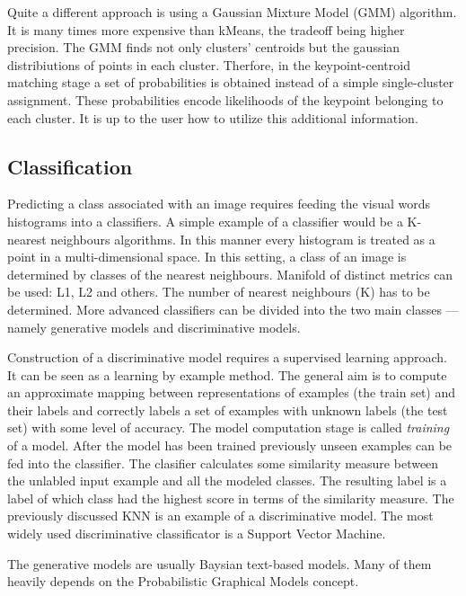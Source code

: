 \documentclass[a4paper,12pt]{article}
\begin{document}
	Quite a different approach is using a Gaussian Mixture Model (GMM) algorithm. It is many times more expensive than kMeans, the tradeoff being higher precision. The GMM finds not only clusters' centroids but the gaussian distribiutions of points in each cluster. Therfore, in the keypoint-centroid matching stage a set of probabilities is obtained instead of a simple single-cluster assignment. These probabilities encode likelihoods of the keypoint belonging to each cluster. It is up to the user how to utilize this additional information.

\subsection{Classification}

	Predicting a class associated with an image requires feeding the visual words histograms into a classifiers. A simple example of a classifier would be a K-nearest neighbours algorithms. In this manner every histogram is treated as a point in a multi-dimensional space. In this setting, a class of an image is determined by classes of the nearest neighbours. Manifold of distinct metrics can be used: L1, L2  and others. The number of nearest neighbours (K) has to be determined. More advanced classifiers can be divided into the two main classes --- namely generative models and discriminative models.
	
	Construction of a discriminative model requires a supervised learning approach. It can be seen as a learning by example method. The general aim is to compute an approximate mapping between representations of examples (the train set) and their labels and correctly labels a set of examples with unknown labels (the test set) with some level of accuracy. The model computation stage is called \emph{training} of a model. After the model has been trained previously unseen examples can be fed into the classifier. The clasifier calculates some similarity measure between the unlabled input example and all the modeled classes. The resulting label is a label of which class had the highest score in terms of the similarity measure. The previously discussed KNN is an example of a discriminative model. The most widely used discriminative classificator is a Support Vector Machine.
	
	The generative models are usually Baysian text-based models. Many of them heavily depends on the Probabilistic Graphical Models concept. 


\end{document}
